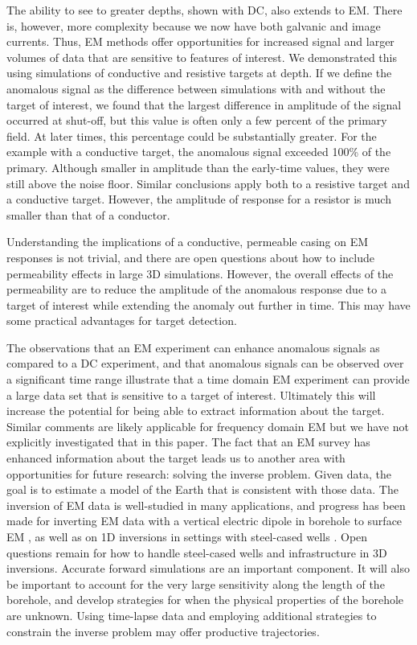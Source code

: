 \documentclass[
    paper
]{geophysics}
\begin{document}
The ability to see to greater depths, shown with DC, also extends to EM. There is, however, more complexity because we now have both galvanic and image currents. Thus, EM methods offer opportunities for increased signal and larger volumes of data that are sensitive to features of interest. We demonstrated this using simulations of conductive and resistive targets at depth. If we define the anomalous signal as the difference between simulations with and without the target of interest, we found that the largest difference in amplitude of the signal occurred at shut-off, but this value is often only a few percent of the primary field. At later times, this percentage could be substantially greater. For the example with a conductive target, the anomalous signal exceeded 100\% of the primary. Although smaller in amplitude than the early-time values, they were still above the noise floor. Similar conclusions apply both to a resistive target and a conductive target. However, the amplitude of response for a resistor is much smaller than that of a conductor.

Understanding the implications of a conductive, permeable casing on EM responses is not trivial, and there are open questions about how to include permeability effects in large 3D simulations. However, the overall effects of the permeability are to reduce the amplitude of the anomalous response due to a target of interest while extending the anomaly out further in time. This may have some practical advantages for target detection.

The observations that an EM experiment can enhance anomalous signals as compared to a DC experiment, and that anomalous signals can be observed over a significant time range illustrate that a time domain EM experiment can provide a large data set that is sensitive to a target of interest. Ultimately this will increase the potential for being able to extract information about the target. Similar comments are likely applicable for frequency domain EM but we have not explicitly investigated that in this paper. The fact that an EM survey has enhanced information about the target leads us to another area with opportunities for future research: solving the inverse problem. Given data, the goal is to estimate a model of the Earth that is consistent with those data. The inversion of EM data is well-studied in many applications, and progress has been made for inverting EM data with a vertical electric dipole in borehole to surface EM \citep{Cuevas2021}, as well as on 1D inversions in settings with steel-cased wells \citep{Tietze2015}. Open questions remain for how to handle steel-cased wells and infrastructure in 3D inversions. Accurate forward simulations are an important component. It will also be important to account for the very large sensitivity along the length of the borehole, and develop strategies for when the physical properties of the borehole are unknown. Using time-lapse data and employing additional strategies to constrain the inverse problem may offer productive trajectories.
\end{document}
